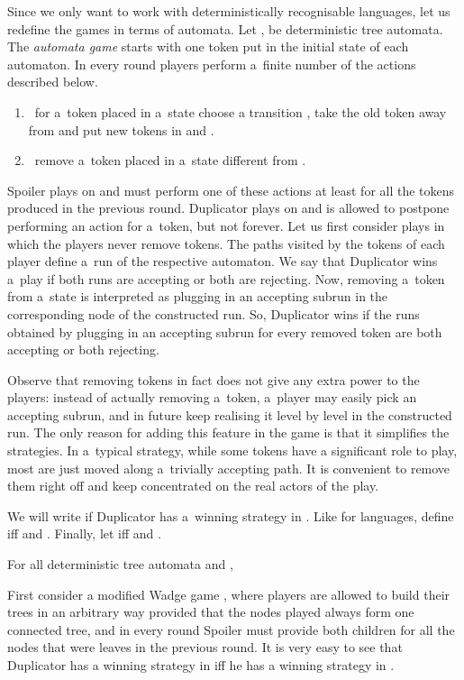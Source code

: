 \documentclass{LMCS}
\begin{document}
Since we only want to work with deterministically recognisable
languages, let us redefine the games in terms of automata. Let ,
 be deterministic tree automata. The {\em automata game} 
starts with one token put in the initial state of each automaton. In
every round players perform a~finite number of the actions described
below.
\begin{enumerate}
\item{}\ for a~token placed
  in a~state  choose a transition , take the old token away
  from  and put new tokens in  and .
\item{}\ remove a~token placed in
  a~state different from .
\end{enumerate}\smallskip
Spoiler plays on  and must perform one of these actions at least
for all the tokens produced in the previous round. Duplicator plays on
 and is allowed to postpone performing an action for a~token, but
not forever. Let us first consider plays in which the players never
remove tokens. The paths visited by the tokens of each player define
a~run of the respective automaton. We say that Duplicator wins a~play
if both runs are accepting or both are rejecting. Now, removing
a~token from a~state  is interpreted as plugging in an accepting
subrun in the corresponding node of the constructed run. So,
Duplicator wins if the runs obtained by plugging in an accepting
subrun for every removed token are both accepting or both rejecting.

Observe that removing tokens in fact does not give any extra power to
the players: instead of actually removing a~token, a~player may easily
pick an accepting subrun, and in future keep realising it level by
level in the constructed run. The only reason for adding this feature
in the game is that it simplifies the strategies. In a~typical
strategy, while some tokens have a significant role to play, most are
just moved along a~trivially accepting path. It is convenient to
remove them right off and keep concentrated on the real actors of the
play.

We will write  if Duplicator has a~winning strategy in . Like for languages, define  iff  and  . Finally, let  iff  and .


\begin{lem} \label{automatagame} 
For all deterministic tree automata  and , 
\end{lem}

\proof First consider a modified Wadge game , where players are allowed to build their trees in an arbitrary way provided that the nodes played always form one connected tree, and in every round Spoiler must provide both children for all the nodes that were leaves in the previous round. It is very easy to see that Duplicator has a winning strategy in  iff he has a winning strategy in .
\end{document}

